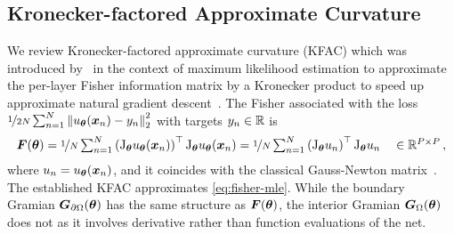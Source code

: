 \subsection{Kronecker-factored Approximate Curvature}\label{sec:kfac-background}

We review Kronecker-factored approximate curvature (KFAC) which was introduced by~\citet{heskes2000natural, martens2015optimizing} in the context of maximum likelihood estimation to approximate the per-layer Fisher information matrix by a Kronecker product to speed up approximate natural gradient descent~\cite{amari1998natural}.
The Fisher associated with the loss $\nicefrac{1}{2N} \sum_{n=1}^N \left\lVert u_{\bm{\theta}}({\bm{x}}_n) - y_n \right\rVert_2^2$ with targets $y_n \in {\mathbb{R}}$ is
\begin{equation}\label{eq:fisher-mle}
  {\bm{F}}({\bm{\theta}})
  =
  \nicefrac{1}{N}
  \textstyle
  \sum_{n=1}^N
  \left(\mathrm{J}_{{\bm{\theta}}} u_{{\bm{\theta}}}({\bm{x}}_n)  \right)^\top
  \mathrm{J}_{{\bm{\theta}}} u_{{\bm{\theta}}}({\bm{x}}_n)
  =
  \nicefrac{1}{N}
  \textstyle
  \sum_{n=1}^N
  \left( \mathrm{J}_{{\bm{\theta}}} u_n \right)^\top
  \mathrm{J}_{{\bm{\theta}}} u_n
  \quad\in {\mathbb{R}}^{P\times P}\,,
\end{equation}
where $u_n = u_{\bm{\theta}}({\bm{x}}_n)$, and it coincides with the classical Gauss-Newton matrix~\citep{martens2020new}.
The established KFAC approximates \eqref{eq:fisher-mle}.
While the boundary Gramian ${\bm{G}}_{\partial\Omega}({\bm{\theta}})$ has the same structure as ${\bm{F}}({\bm{\theta}})$, the interior Gramian ${\bm{G}}_\Omega({\bm{\theta}})$ does not as it involves derivative rather than function evaluations of the net.

